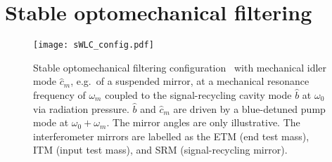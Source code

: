 \section{Stable optomechanical filtering}
\label{sec:sWLC}

\begin{figure}
	\centering
	\texttt{[image: sWLC\_config.pdf]}
	\caption{ Stable optomechanical filtering configuration~\cite{liEnhancingInterferometerSensitivity2021} with mechanical idler mode $\hat{c}_m$, e.g.\ of a suspended mirror, at a mechanical resonance frequency of $\omega_m$ coupled to the signal-recycling cavity mode $\hat b$ at $\omega_0$ via radiation pressure. $\hat b$ and $\hat{c}_m$ are driven by a blue-detuned pump mode at $\omega_0+\omega_m$. The mirror angles are only illustrative. The interferometer mirrors are labelled as the ETM (end test mass), ITM (input test mass), and SRM (signal-recycling mirror).}
	\label{fig:sWLC_config}
\end{figure}



